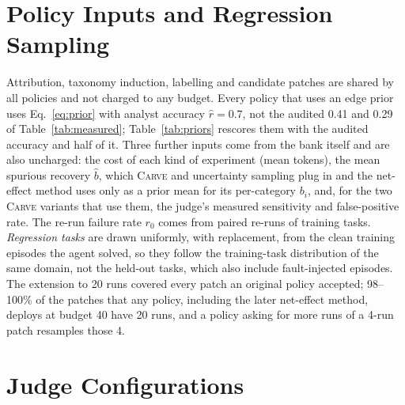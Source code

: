 \documentclass[11pt]{article}
\newcommand{\carve}{\textsc{Carve}}
\begin{document}
\section{Policy Inputs and Regression Sampling}
\label{app:inputs}

Attribution, taxonomy induction, labelling and candidate patches are shared by all policies and not charged to any budget. Every policy that uses an edge prior uses Eq.~\ref{eq:prior} with analyst accuracy $\hat r=0.7$, not the audited 0.41 and 0.29 of Table~\ref{tab:measured}; Table~\ref{tab:priors} rescores them with the audited accuracy and half of it. Three further inputs come from the bank itself and are also uncharged: the cost of each kind of experiment (mean tokens), the mean spurious recovery $\hat b$, which \carve{} and uncertainty sampling plug in and the net-effect method uses only as a prior mean for its per-category $b_i$, and, for the two \carve{} variants that use them, the judge's measured sensitivity and false-positive rate. The re-run failure rate $r_0$ comes from paired re-runs of training tasks. \emph{Regression tasks} are drawn uniformly, with replacement, from the clean training episodes the agent solved, so they follow the training-task distribution of the same domain, not the held-out tasks, which also include fault-injected episodes. The extension to 20 runs covered every patch an original policy accepted; 98--100\% of the patches that any policy, including the later net-effect method, deploys at budget 40 have 20 runs, and a policy asking for more runs of a 4-run patch resamples those 4.

\section{Judge Configurations}
\label{app:judges}
\end{document}
